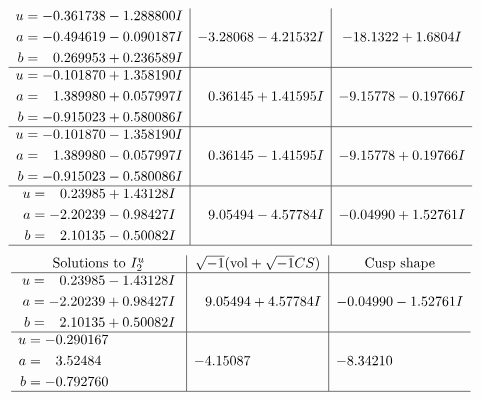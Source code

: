 \documentclass[1p]{elsarticle_modified}
\theoremstyle{definition}
\newcommand{\I}{\sqrt{-1}}
\begin{document}
$$\begin{array}{c|c|c}
\begin{aligned}
u &= -0.361738 - 1.288800 I \\
a &= -0.494619 - 0.090187 I \\
b &= \phantom{-}0.269953 + 0.236589 I\end{aligned}
 & -3.28068 - 4.21532 I & -18.1322 + 1.6804 I \\ \hline\begin{aligned}
u &= -0.101870 + 1.358190 I \\
a &= \phantom{-}1.389980 + 0.057997 I \\
b &= -0.915023 + 0.580086 I\end{aligned}
 & \phantom{-}0.36145 + 1.41595 I & -9.15778 - 0.19766 I \\ \hline\begin{aligned}
u &= -0.101870 - 1.358190 I \\
a &= \phantom{-}1.389980 - 0.057997 I \\
b &= -0.915023 - 0.580086 I\end{aligned}
 & \phantom{-}0.36145 - 1.41595 I & -9.15778 + 0.19766 I \\ \hline\begin{aligned}
u &= \phantom{-}0.23985 + 1.43128 I \\
a &= -2.20239 - 0.98427 I \\
b &= \phantom{-}2.10135 - 0.50082 I\end{aligned}
 & \phantom{-}9.05494 - 4.57784 I & -0.04990 + 1.52761 I\\
 \hline 
 \end{array}$$\newpage$$\begin{array}{c|c|c}  
\text{Solutions to }I^u_{2}& \I (\text{vol} + \sqrt{-1}CS) & \text{Cusp shape}\\
 \hline 
\begin{aligned}
u &= \phantom{-}0.23985 - 1.43128 I \\
a &= -2.20239 + 0.98427 I \\
b &= \phantom{-}2.10135 + 0.50082 I\end{aligned}
 & \phantom{-}9.05494 + 4.57784 I & -0.04990 - 1.52761 I \\ \hline\begin{aligned}
u &= -0.290167\phantom{ +0.000000I} \\
a &= \phantom{-}3.52484\phantom{ +0.000000I} \\
b &= -0.792760\phantom{ +0.000000I}\end{aligned}
 & -4.15087\phantom{ +0.000000I} & -8.34210\phantom{ +0.000000I}\\
 \hline 
 \end{array}$$\newpage
\end{document}
